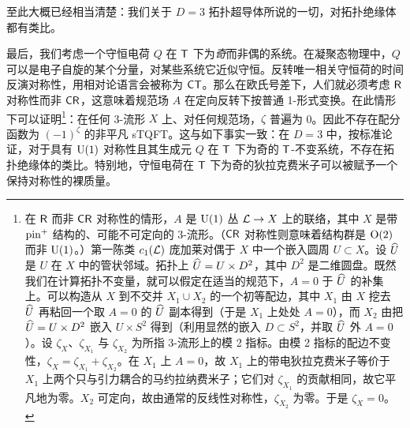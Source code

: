 
至此大概已经相当清楚：我们关于 $D=3$ 拓扑超导体所说的一切，对拓扑绝缘体都有类比。

最后，我们考虑一个守恒电荷 $Q$ 在 ${\sf T}$ 下为{\it 奇}而非偶的系统。在凝聚态物理中，$Q$ 可以是电子自旋的某个分量，对某些系统它近似守恒。反转唯一相关守恒荷的时间反演对称性，用相对论语言会被称为 ${\sf{CT}}$。那么在欧氏号差下，人们就必须考虑 ${\sf R}$ 对称性而非 ${\sf{CR}}$，这意味着规范场 $A$ 在定向反转下按普通 1-形式变换。在此情形下可以证明\footnote{在 ${\sf R}$ 而非 ${\sf{CR}}$ 对称性的情形，$A$ 是 ${\mathrm U}(1)$ 丛 ${\mathcal L}\to X$ 上的联络，其中 $X$ 是带 ${\mathrm{pin}}^+$ 结构的、可能不可定向的 3-流形。（${\sf{CR}}$ 对称性则意味着结构群是 ${\mathrm O}(2)$ 而非 ${\mathrm U}(1)$。）第一陈类 $c_1({\mathcal L})$ 庞加莱对偶于 $X$ 中一个嵌入圆周 $U\subset X$。设 $\widehat U$ 是 $U$ 在 $X$ 中的管状邻域。拓扑上 $\widehat U=U\times D^2$，其中 $D^2$ 是二维圆盘。既然我们在计算拓扑不变量，就可以假定在适当的规范下，$A=0$ 于 $\widehat U$ 的补集上。可以构造从 $X$ 到不交并 $X_1\cup X_2$ 的一个初等配边，其中 $X_1$ 由 $X$ 挖去 $\widehat U$ 再粘回一个取 $A=0$ 的 $\widehat U$ 副本得到（于是 $X_1$ 上处处 $A=0$），而 $X_2$ 由把 $\widehat U=U\times D^2$ 嵌入 $U\times S^2$ 得到（利用显然的嵌入 $D\subset S^2$，并取 $\widehat U$ 外 $A=0$）。设 $\zeta_X$、$\zeta_{X_1}$ 与 $\zeta_{X_2}$ 为所指 3-流形上的模 2 指标。由模 2 指标的配边不变性，$\zeta_X=\zeta_{X_1}+ \zeta_{X_2}$。在 $X_1$ 上 $A=0$，故 $X_1$ 上的带电狄拉克费米子等价于 $X_1$ 上两个只与引力耦合的马约拉纳费米子；它们对 $\zeta_{X_1}$ 的贡献相同，故它平凡地为零。$X_2$ 可定向，故由通常的反线性对称性，$\zeta_{X_2}$ 为零。于是 $\zeta_X=0$。}：在任何 3-流形 $X$ 上、对任何规范场，$\zeta$ 普遍为 0。因此不存在配分函数为 $(-1)^\zeta$ 的非平凡 sTQFT。这与如下事实一致：在 $D=3$ 中，按标准论证，对于具有 ${\mathrm U}(1)$ 对称性且其生成元 $Q$ 在 ${\sf T}$ 下为奇的 ${\sf T}$-不变系统，不存在拓扑绝缘体的类比。特别地，守恒电荷在 ${\sf T}$ 下为奇的狄拉克费米子可以被赋予一个保持对称性的裸质量。
